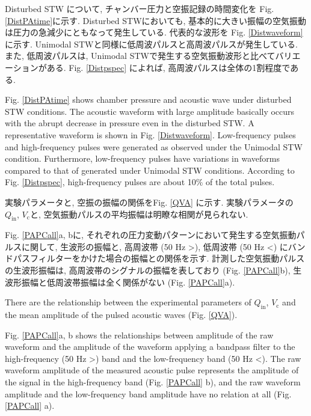 \documentclass[12pt]{article}
\begin{document}
Disturbed STW について, チャンバー圧力と空振記録の時間変化を Fig. \ref{DistPAtime}に示す. 
Disturbed STWにおいても, 基本的に大きい振幅の空気振動は圧力の急減少にともなって発生している. 
代表的な波形を Fig. \ref{Distwaveform} に示す. 
Unimodal STWと同様に低周波パルスと高周波パルスが発生している. 
また, 低周波パルスは, Unimodal STWで発生する空気振動波形と比べてバリエーションがある. Fig. \ref{Distpspec} によれば, 高周波パルスは全体の1割程度である. 

Fig. \ref {DistPAtime} shows chamber pressure and acoustic wave under disturbed STW conditions.
The acoustic waveform with large amplitude basically occurs with the abrupt decrease in pressure even in the disturbed STW.
A representative waveform is shown in Fig. \ref {Distwaveform}. 
Low-frequency pulses and high-frequency pulses were generated as observed under the Unimodal STW condition.
Furthermore, low-frequency pulses have variations in waveforms compared to that of generated under Unimodal STW conditions.
According to Fig. \ref{Distpspec}, high-frequency pulses are about 10$\%$ of the total pulses.


実験パラメータと, 空振の振幅の関係をFig. \ref{QVA} に示す. 
実験パラメータの $Q_\mathrm{in}$, $V_\mathrm{c}$と, 空気振動パルスの平均振幅は明瞭な相関が見られない. 

Fig. \ref{PAPCall}a, bに, それぞれの圧力変動パターンにおいて発生する空気振動パルスに関して, 生波形の振幅と, 高周波帯 (50 Hz >), 低周波帯 (50 Hz <) にバンドパスフィルターをかけた場合の振幅との関係を示す. 
計測した空気振動パルスの生波形振幅は, 高周波帯のシグナルの振幅を表しており (Fig. \ref{PAPCall}b), 生波形振幅と低周波帯振幅は全く関係がない (Fig. \ref{PAPCall}a). 

There are the relationship between the experimental parameters of $Q_\mathrm{in}$, $V_\mathrm{c}$ and the mean amplitude of the pulsed acoustic waves (Fig. \ref{QVA}).

Fig. \ref{PAPCall}a, b shows the relationships between amplitude of the raw waveform and the amplitude of the waveform applying a bandpass filter to the high-frequency (50 Hz >) band and the low-frequency band (50 Hz <).
The raw waveform amplitude of the measured acoustic pulse represents the amplitude of the signal in the high-frequency band (Fig. \ref {PAPCall} b), and the raw waveform amplitude and the low-frequency band amplitude have no relation at all (Fig. \ref{PAPCall} a).
\end{document}
